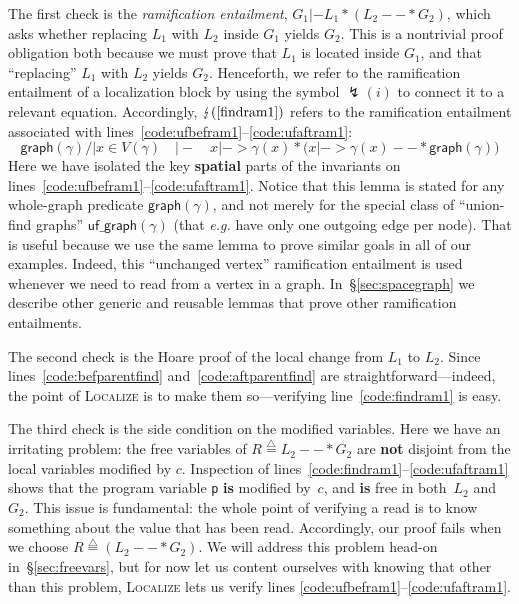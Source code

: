 \documentclass[acmsmall,screen]{acmart}
\newcommand{\li}[1]{{\texttt{\small #1}}}
\newcommand{\defeq}{\mathbin{\stackrel{\triangle}{=}}}
\newcommand{\p}[1]{\ensuremath{\mathsf{#1}}} \newcommand{\m}[1]{\ensuremath{\mathit{#1}}} \newcommand{\ma}[1]{\ensuremath{\mathcal{#1}}} \let\ramify\lightning
\begin{document}
The first check is the \emph{ramification entailment}, $G_1 |- L_1 * (L_2 --* G_2)$,
which asks whether replacing $L_1$ with $L_2$ inside $G_1$ yields $G_2$.
This is a nontrivial proof obligation both because
we must prove that $L_1$ is located inside $G_1$, and that
``replacing'' $L_1$ with $L_2$ yields $G_2$.
Henceforth, we refer to the ramification entailment of a localization block by
using the symbol $\ramify(i)$ to connect it to a relevant equation.  Accordingly, $\ramify(\ref{findram1})$ refers to the ramification entailment
associated with lines~\ref{code:ufbefram1}--\ref{code:ufaftram1}:
\begin{equation}
\label{findram1}
\p{graph}(\gamma) /| x \in V(\gamma) \quad |- \quad x |-> \gamma(x) * \big(x |-> \gamma(x) --* \p{graph}(\gamma)\big)
\end{equation}
Here we have isolated the key \textbf{spatial} parts of the invariants on lines~\ref{code:ufbefram1}--\ref{code:ufaftram1}.  Notice that this lemma is stated for any whole-graph predicate $\p{graph}(\gamma)$, and not merely for the special class of ``union-find graphs'' $\p{uf\_graph}(\gamma)$ (that \emph{e.g.} have only one outgoing edge per node).  That is useful because we use the same lemma to prove similar goals in all of our examples.
Indeed, this ``unchanged vertex'' ramification entailment is used whenever we need to read from a vertex in a graph.  In~\S\ref{sec:spacegraph} we describe other generic and reusable lemmas that prove other ramification entailments.

The second check is the Hoare proof of the local
change from $L_1$ to $L_2$.  Since lines~\ref{code:befparentfind} and~\ref{code:aftparentfind}
are straightforward---indeed, the point of \textsc{Localize} is to make them
so---verifying line~\ref{code:findram1} is easy.

The third check is the side condition on the modified variables.  Here we have an irritating
problem: the free variables of $R \defeq L_2 --* G_2$ are \textbf{not} disjoint from
the local variables modified by $c$.  Inspection of lines~\ref{code:findram1}--\ref{code:ufaftram1} shows that the program variable \li{p} \textbf{is} modified by~$c$,
and \textbf{is} free in both~$L_2$ and~$G_2$.
This issue is fundamental: the whole point of verifying
a read is to know something about the value that has been read.
Accordingly, our proof fails when we choose $R \defeq (L_2 --* G_2)$.
We will address this problem
head-on in~\S\ref{sec:freevars}, but for now let us content ourselves with knowing
that other than this problem, \textsc{Localize} lets us verify
lines \ref{code:ufbefram1}--\ref{code:ufaftram1}.
\end{document}
